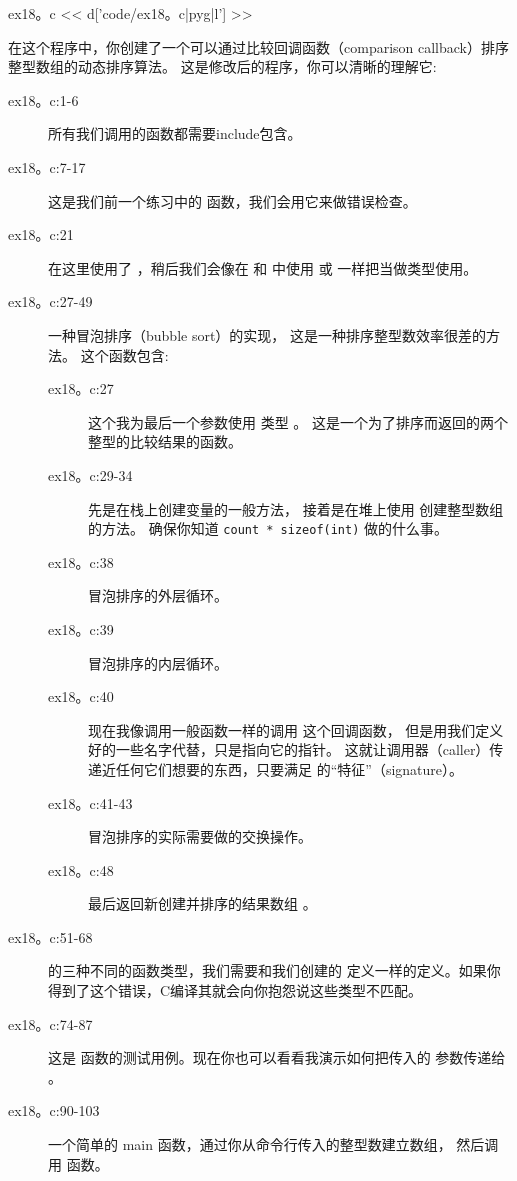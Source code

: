 \begin{code}{ex18。c}
<< d['code/ex18。c|pyg|l'] >>
\end{code}

在这个程序中，你创建了一个可以通过比较回调函数（comparison callback）排序整型数组的动态排序算法。 这是修改后的程序，你可以清晰的理解它:

\begin{description}
\item[ex18。c:1-6] 所有我们调用的函数都需要include包含。
\item[ex18。c:7-17] 这是我们前一个练习中的  函数，我们会用它来做错误检查。
\item[ex18。c:21] 在这里使用了 ，稍后我们会像在  和  中使用  或  一样把当做类型使用。
\item[ex18。c:27-49] 一种冒泡排序（bubble sort）的实现， 这是一种排序整型数效率很差的方法。 这个函数包含:
    \begin{description}
    \item[ex18。c:27] 这个我为最后一个参数使用  类型 。 这是一个为了排序而返回的两个整型的比较结果的函数。
    \item[ex18。c:29-34] 先是在栈上创建变量的一般方法， 接着是在堆上使用  创建整型数组的方法。 确保你知道 \verb|count * sizeof(int)| 做的什么事。
    \item[ex18。c:38] 冒泡排序的外层循环。
    \item[ex18。c:39] 冒泡排序的内层循环。
    \item[ex18。c:40] 现在我像调用一般函数一样的调用  这个回调函数， 但是用我们定义好的一些名字代替，只是指向它的指针。 这就让调用器（caller）传递近任何它们想要的东西，只要满足 的“特征”（signature）。
    \item[ex18。c:41-43] 冒泡排序的实际需要做的交换操作。
    \item[ex18。c:48] 最后返回新创建并排序的结果数组 。
    \end{description}
\item[ex18。c:51-68]  的三种不同的函数类型，我们需要和我们创建的  定义一样的定义。如果你得到了这个错误，C编译其就会向你抱怨说这些类型不匹配。
\item[ex18。c:74-87] 这是 函数的测试用例。现在你也可以看看我演示如何把传入的  参数传递给 。
\item[ex18。c:90-103] 一个简单的 main 函数，通过你从命令行传入的整型数建立数组， 然后调用  函数。

\end{description}
